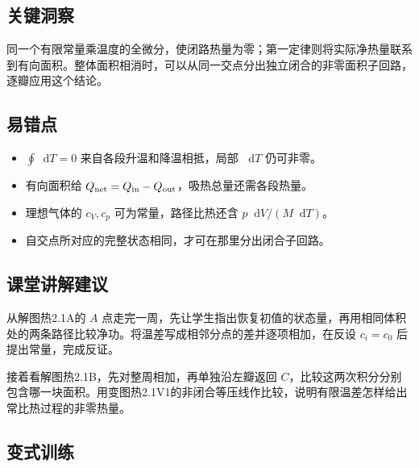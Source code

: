 \documentclass[UTF8,fontset=fandol,a4paper,11pt]{ctexart}
\newcommand{\dd}{\mathop{}\!\mathrm{d}}
\begin{document}


\subsection*{关键洞察}

同一个有限常量乘温度的全微分，使闭路热量为零；第一定律则将实际净热量联系到有向面积。整体面积相消时，可以从同一交点分出独立闭合的非零面积子回路，逐瓣应用这个结论。



\subsection*{易错点}

\begin{itemize}
\item $\oint\dd T=0$ 来自各段升温和降温相抵，局部 $\dd T$ 仍可非零。
\item 有向面积给 $Q_{\rm net}=Q_{\rm in}-Q_{\rm out}$，吸热总量还需各段热量。
\item 理想气体的 $c_V,c_p$ 可为常量，路径比热还含 $p\dd V/(M\dd T)$。
\item 自交点所对应的完整状态相同，才可在那里分出闭合子回路。
\end{itemize}



\subsection*{课堂讲解建议}

从解图热2.1A的 $A$ 点走完一周，先让学生指出恢复初值的状态量，再用相同体积处的两条路径比较净功。将温差写成相邻分点的差并逐项相加，在反设 $c_i=c_0$ 后提出常量，完成反证。

接着看解图热2.1B，先对整周相加，再单独沿左瓣返回 $C$，比较这两次积分分别包含哪一块面积。用变图热2.1V1的非闭合等压线作比较，说明有限温差怎样给出常比热过程的非零热量。



\subsection*{变式训练}
\end{document}
